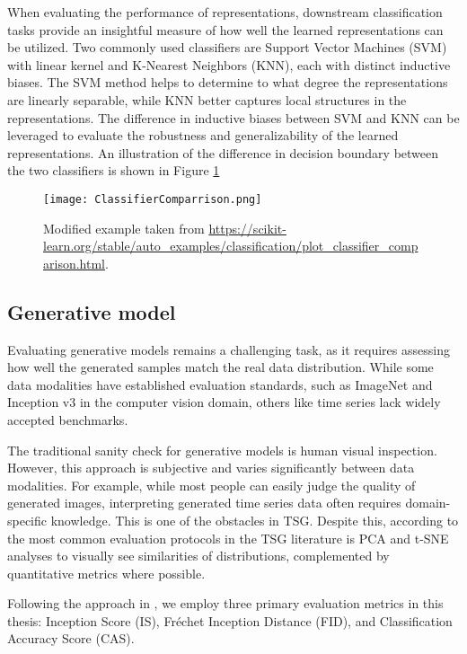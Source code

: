 \documentclass[../../thesis.tex]{subfiles}
\begin{document}
When evaluating the performance of representations, downstream classification tasks provide an insightful measure of how well the learned representations can be utilized. Two commonly used classifiers are Support Vector Machines (SVM) with linear kernel and K-Nearest Neighbors (KNN), each with distinct inductive biases. The SVM method helps to determine to what degree the representations are linearly separable, while KNN better captures local structures in the representations. The difference in inductive biases between SVM and KNN can be leveraged to evaluate the robustness and generalizability of the learned representations. An illustration of the difference in decision boundary between the two classifiers is shown in Figure \ref{fig:ClassifierComparrison}

\begin{figure}[h]
    \texttt{[image: ClassifierComparrison.png]}
    \centering
    \caption{Modified example taken from \url{https://scikit-learn.org/stable/auto_examples/classification/plot_classifier_comparison.html}.}
    \label{fig:ClassifierComparrison}
\end{figure}

\subsection{Generative model}

Evaluating generative models remains a challenging task, as it requires assessing how well the generated samples match the real data distribution. While some data modalities have established evaluation standards, such as ImageNet and Inception v3 in the computer vision domain, others like time series lack widely accepted benchmarks.\newline

The traditional sanity check for generative models is human visual inspection. However, this approach is subjective and varies significantly between data modalities. For example, while most people can easily judge the quality of generated images, interpreting generated time series data often requires domain-specific knowledge. This is one of the obstacles in TSG. Despite this, according to \cite{TimeVQVAE} the most common evaluation protocols in the TSG literature is PCA and t-SNE analyses to visually see similarities of distributions, complemented by quantitative metrics where possible.\newline

Following the approach in \cite{TimeVQVAE}, we employ three primary evaluation metrics in this thesis: Inception Score (IS), Fréchet Inception Distance (FID), and Classification Accuracy Score (CAS).\newline
\end{document}
